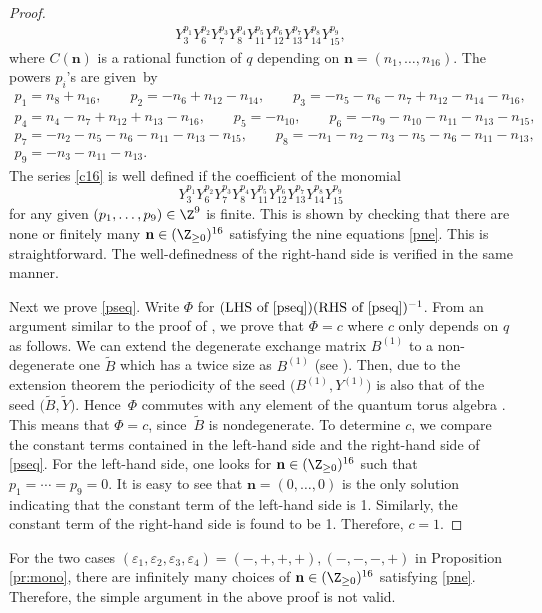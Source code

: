 \begin{proof}
\begin{gather}
 Y_3^{p_1} Y_6^{p_2} Y_7^{p_3} Y_8^{p_4} Y_{11}^{p_5} Y_{12}^{p_6} Y_{13}^{p_7} Y_{14}^{p_8}Y_{15}^{p_9},\label{c16}
 \end{gather}
 where $C(\mathbf{n})$ is a rational function of $q$ depending on
 $\mathbf{n}=(n_1, \dotsc, n_{16})$. The powers $p_i$'s are given~by
\begin{gather}
p_1 = n_8+n_{16},\qquad p_2 = -n_6+n_{12}-n_{14},\qquad p_3 = -n_{5} - n_{6} - n_{7} + n_{12}-n_{14}-n_{16},
\nonumber\\
p_4 = n_4-n_7+n_{12}+n_{13}-n_{16}, \qquad
p_5 = -n_{10},
 \qquad p_6 = -n_9-n_{10}-n_{11}-n_{13}-n_{15},
\nonumber\\
 p_7 = -n_2-n_5-n_{6}-n_{11}-n_{13}-n_{15},
\qquad
 p_8 = -n_1 -n_2-n_3-n_5-n_6 - n_{11}-n_{13},\nonumber\\
 p_9 = -n_3-n_{11}-n_{13}.
\label{pne}
\end{gather}
The series \eqref{c16} is well defined if the coefficient of the monomial
\[
Y_3^{p_1} Y_6^{p_2} Y_7^{p_3} Y_8^{p_4} Y_{11}^{p_5} Y_{12}^{p_6} Y_{13}^{p_7} Y_{14}^{p_8} Y_{15}^{p_9}
\]
for any given $(p_1,\dotsc, p_9) \in \Z^9$ is finite.
This is shown by checking that there are none or finitely many
$\mathbf{n} \in (\Z_{\ge 0})^{16}$
satisfying the nine equations \eqref{pne}.
This is straightforward.
The well-definedness of the right-hand side is verified in the same manner.


Next we prove \eqref{pseq}.
Write $\Phi$ for $(\text{LHS of \eqref{pseq}})(\text{RHS of
\eqref{pseq}})^{-1}$.
From an argument similar to the proof of \cite[Theorem~3.5]{KN11}, we prove
that $\Phi= c$ where $c$ only depends on $q$ as follows.
We can extend the degenerate exchange matrix $B^{(1)}$ to a non-degenerate one
$\tilde{B}$ which has a twice size as $B^{(1)}$ (see \cite[Example 2.5]{KN11}).
Then, due to the extension theorem \cite[Theorem~4.3]{N11} the
periodicity of the seed $\bigl(B^{(1)},Y^{(1)}\bigr)$ is also that of the seed
$\bigl(\tilde{B},\tilde{Y}\bigr)$. Hence~$\Phi$ commutes with any element of the quantum torus algebra
. This means that $\Phi=c$, since~$\tilde{B}$
is nondegenerate.
To determine $c$, we compare the constant terms contained in the
left-hand side and the right-hand side of \eqref{pseq}. For the left-hand side, one looks for
$\mathbf{n} \in (\Z_{\ge 0})^{16}$ such that $p_1 = \dotsb = p_9 = 0$.
It is easy to see that $\mathbf{n}=(0,\dotsc, 0)$ is the only solution
indicating that the constant term of the left-hand side is 1. Similarly, the
constant term of the right-hand side is found to be 1. Therefore, $c=1$.
\end{proof}

\begin{Remark}
 For the two cases
 $(\varepsilon_1,\varepsilon_2,\varepsilon_3,\varepsilon_4)=(-,+,+,+),
 (-,-,-,+)$ in Proposition \ref{pr:mono}, there are infinitely many
 choices of $\mathbf{n} \in (\Z_{\ge 0})^{16}$ satisfying
 \eqref{pne}. Therefore, the simple argument in the above proof is not
 valid.
\end{Remark}
